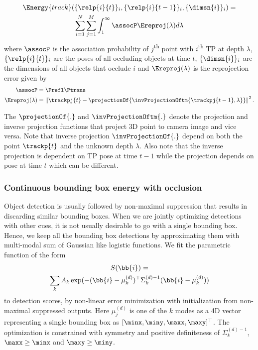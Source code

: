 \begin{multline}
  \Energy{track}(\{ \relp{i}{t} \}_i, \{ \relp{i}{t-1} \}_i, \{\dimsn{i}\}_i ) = 
  \\
    \sum_{i=1}^{N} 
    \sum_{j = 1}^{M}
    \int_1^\infty \assocP\Ereproj(\lambda) d\lambda
\end{multline}
where $\assocP$ is the association probability of
$j$\textsuperscript{th} point with $i$\textsuperscript{th} TP at depth $\lambda$, $\{ \relp{i}{t} \}_i$ are the poses of all occluding objects at time $t$, $ \{ \dimsn{i} \}_i$ are the dimensions of all objects that occlude $i$
and $\Ereproj(\lambda)$ is the reprojection error given by
%
\begin{align}
  \assocP &= \Prefl\Ptrans\\
  \Ereproj(\lambda) &= \left\|\trackpj{t} - \projectionOf{\invProjectionOftm{\trackpj{t-1}, \lambda}}\right\|^2 .
  \label{eq:reprojerror}
\end{align}

The  $\projectionOf{.}$ and $\invProjectionOftm{.}$ denote the projection and
inverse projection functions that project 3D point to camera image and vice
versa. Note that inverse projection $\invProjectionOf{.}$ depend on both the
point $\trackp{t}$ and the unknown depth $\lambda$. Also note that the inverse projection is dependent on TP pose at time $t-1$ while the projection depends on pose at time $t$ which can be different.

\subsubsection{Continuous bounding box energy with occlusion}

Object detection is usually followed by non-maximal suppression that results in
discarding similar bounding boxes. When we are jointly optimizing detections
with other cues, it is not usually desirable to go with a single bounding box.
Hence, we keep all the bounding box detections by approximating them with
multi-modal sum of Gaussian like logistic functions. We fit the parametric function of the form 
%
\begin{multline}
  S(\bb{i}) = \\
  \sum_k A_k \exp(-(\bb{i}-\mu^{(d)}_k)^\top \Sigma^{(d)-1}_k
  (\bb{i}-\mu^{(d)}_k))
\end{multline}
%
to detection scores, by non-linear error minimization with initialization from
non-maximal suppressed outputs. Here $\mu^{(d)}_j$ is one of the $k$ modes as a
4D vector representing a single bounding box as $[\minx, \miny, \maxx,
\maxy]^\top$. The optimization is constrained with symmetry and positive
definiteness of $\Sigma^{(d)-1}_k$, $\maxx \ge \minx$ and $\maxy \ge \miny$.

